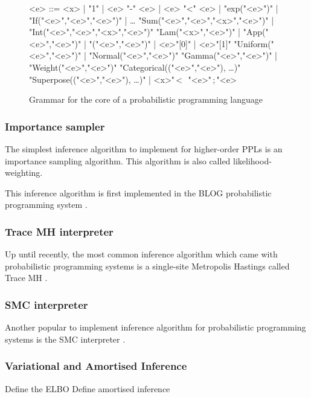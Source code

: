 \documentclass[12pt]{article}
\theoremstyle{definition}
\begin{document}
\begin{figure}
\begin{grammar}
  <e> ::= <x> | "1" | <e> "-" <e> | <e> "<" <e> | "exp("<e>")" | "If("<e>","<e>","<e>")" | \dots
\alt "Sum("<e>","<e>","<x>","<e>")" | "Int("<e>","<e>","<x>","<e>")"
\alt "Lam("<x>","<e>")" | "App("<e>","<e>")" | "("<e>","<e>")" | <e>"[0]" | <e>"[1]"
\alt "Uniform("<e>","<e>")" | "Normal("<e>","<e>")"
\alt "Gamma("<e>","<e>")" | "Weight("<e>","<e>")"
\alt "Categorical(("<e>","<e>"), \dots)"
\alt "Superpose(("<e>","<e>"), \dots)" | <x>"\,<~\,"<e>"\,;\,"<e>
\end{grammar}
\caption{Grammar for the core of a probabilistic programming language}
\label{fig:coregrammar}
\end{figure}

\subsubsection{Importance sampler}

The simplest inference algorithm to implement for higher-order PPLs is
an importance sampling algorithm. This algorithm is also called likelihood-weighting.

This inference algorithm is first implemented in the BLOG
probabilistic programming system \citep{milchijcai2005}.

\subsubsection{Trace MH interpreter}

Up until recently, the most common inference algorithm which came with
probabilistic programming systems is a single-site Metropolis Hastings called
Trace MH \citep{scibior2018functional,wingate2011lightweight}.

\subsubsection{SMC interpreter}

Another popular to implement inference algorithm for probabilistic
programming systems is the SMC interpreter \citep{wood2014new}.

\subsubsection{Variational and Amortised Inference}

Define the ELBO
Define amortised inference
\end{document}
